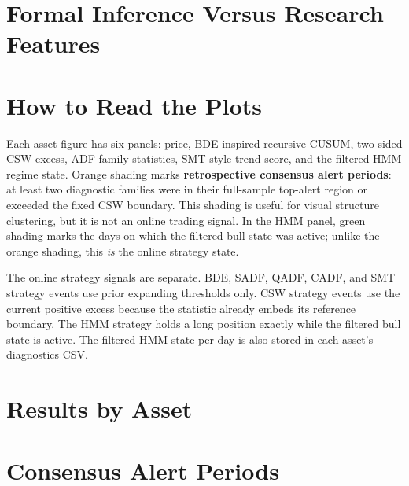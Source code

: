 \documentclass[11pt]{article}
\begin{document}
\section{Formal Inference Versus Research Features}

\begin{table}[H]
\centering
\scriptsize
\setlength{\tabcolsep}{4pt}
\caption{Interpretation labels for the report's diagnostics and strategy conversions.}
\end{table}

\section{How to Read the Plots}

Each asset figure has six panels: price, BDE-inspired recursive CUSUM, two-sided CSW excess, ADF-family statistics, SMT-style trend score, and the filtered HMM regime state. Orange shading marks \textbf{retrospective consensus alert periods}: at least two diagnostic families were in their full-sample top-alert region or exceeded the fixed CSW boundary. This shading is useful for visual structure clustering, but it is not an online trading signal. In the HMM panel, green shading marks the days on which the filtered bull state was active; unlike the orange shading, this \emph{is} the online strategy state.

The online strategy signals are separate. BDE, SADF, QADF, CADF, and SMT strategy events use prior expanding thresholds only. CSW strategy events use the current positive excess because the statistic already embeds its reference boundary. The HMM strategy holds a long position exactly while the filtered bull state is active. The filtered HMM state per day is also stored in each asset's diagnostics CSV.

\section{Results by Asset}


\section{Consensus Alert Periods}
\end{document}
